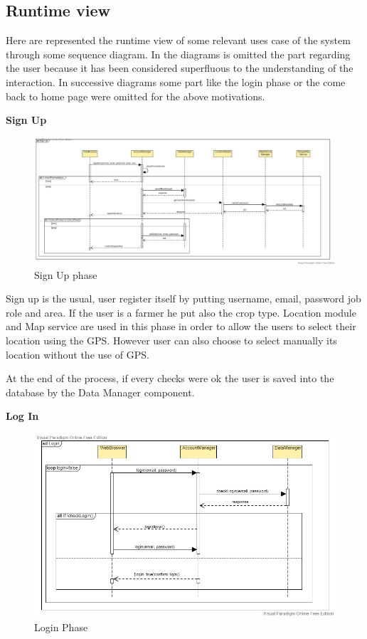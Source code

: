 \documentclass[table, 12pt]{article}
\begin{document}
\newpage
\subsection{Runtime view}

Here are represented the runtime view of some relevant uses case of the system through some sequence diagram. 
In the diagrams is omitted the part regarding the user because it has been considered superfluous to the understanding of the interaction.
In successive diagrams some part like the login phase or the come back to home page were omitted for the above motivations.

\newpage
\textbf{Sign Up}
\begin{center}
    \begin{figure}[H]
        \includegraphics[scale=0.38, center]{assets/SequenceDiagram/SignUp.jpg}
        \caption{Sign Up phase}
        \label{fig:signup}
    \end{figure}
\end{center}
Sign up is the usual, user register itself by putting username, email, password job role and area. If the user is a farmer he put also the crop type.
Location module and Map service are used in this phase in order to allow the users to select their location using the GPS. 
However user can also choose to select manually its location without the use of GPS.

At the end of the process, if every checks were ok the user is saved into the database by the Data Manager component.

\newpage
\textbf{Log In}
\begin{center}
    \begin{figure}[H]
        \includegraphics[scale=0.6, center]{assets/SequenceDiagram/Login.jpg}
        \caption{Login Phase}
        \label{fig: login}
    \end{figure}
\end{center}
\end{document}
